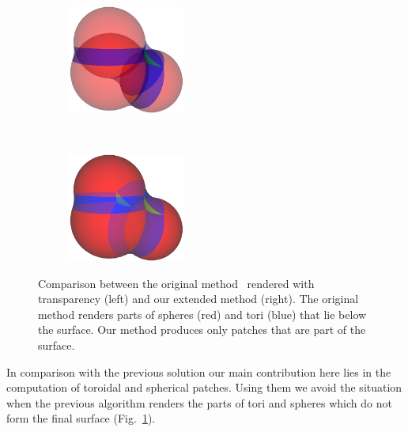 \begin{figure}[htp]
  \centering
  \begin{subfigure}[t]{0.48\columnwidth}
    \centering
    \includegraphics[width=1.5in]{image/cb-krone.png}
  \end{subfigure}%
  ~
  \begin{subfigure}[t]{0.48\columnwidth}
    \centering
    \includegraphics[width=1.5in]{image/cb-oit.png}
  \end{subfigure}
	
\caption{Comparison between the original method~\cite{krone2011parallel} rendered with transparency (left) and our extended method (right).
The original method renders parts of spheres (red) and tori (blue) that lie below the surface.
Our method produces only patches that are part of the surface.
}
\label{fig:cb-oit}
\end{figure}

In comparison with the previous solution our main contribution here lies in the computation of toroidal and spherical patches.
Using them we avoid the situation when the previous algorithm renders the parts of tori and spheres which do not form the final surface (Fig.~\ref{fig:cb-oit}).



